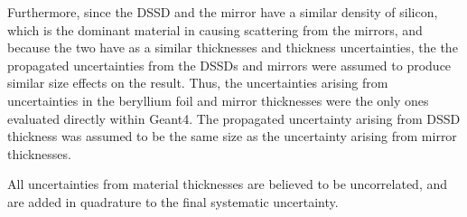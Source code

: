 Furthermore, since the DSSD and the mirror have a similar density of silicon, which is the dominant material in causing scattering from the mirrors, and because the two have as a similar thicknesses and thickness uncertainties, the the propagated uncertainties from the DSSDs and mirrors were assumed to produce similar size effects on the result.  Thus, the uncertainties arising from uncertainties in the beryllium foil and mirror thicknesses were the only ones evaluated directly within Geant4.  The propagated uncertainty arising from DSSD thickness was assumed to be the same size as the uncertainty arising from mirror thicknesses.  

All uncertainties from material thicknesses are believed to be uncorrelated, and are added in quadrature to the final systematic uncertainty.  


 


%


